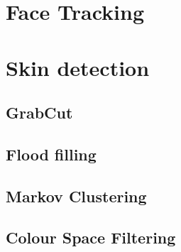 \section{Face Tracking}

\section{Skin detection}
\subsection{GrabCut}
\subsection{Flood filling}
\subsection{Markov Clustering}
\subsection{Colour Space Filtering}